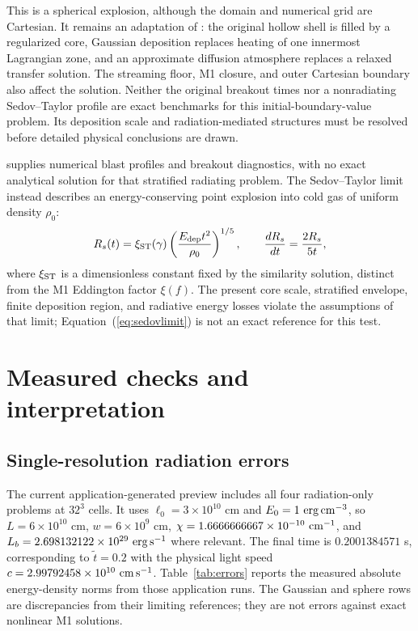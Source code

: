 \documentclass[manuscript]{aastex7}
\begin{document}
This is a spherical explosion, although the domain and numerical grid are
Cartesian. It remains an adaptation of \citet{Ensman1994}: the original
hollow shell is filled by a regularized core, Gaussian deposition replaces
heating of one innermost Lagrangian zone, and an approximate diffusion
atmosphere replaces a relaxed transfer solution. The streaming floor,
M1 closure, and outer Cartesian boundary also affect the solution. Neither
the original breakout times nor a nonradiating Sedov--Taylor profile are
exact benchmarks for this initial-boundary-value problem. Its deposition
scale and radiation-mediated structures must be resolved before detailed
physical conclusions are drawn.

\citet[Section~5.3]{Ensman1994} supplies numerical blast profiles and
breakout diagnostics, with no exact analytical solution for that
stratified radiating problem. The Sedov--Taylor limit instead describes
an energy-conserving point explosion into cold gas of uniform density
$\rho_0$:
\begin{equation}
 R_s(t)=\xi_{\rm ST}(\gamma)\left(\frac{E_{\rm dep}t^2}{\rho_0}\right)^{1/5},
 \qquad \frac{dR_s}{dt}=\frac{2R_s}{5t},
 \label{eq:sedovlimit}
\end{equation}
where $\xi_{\rm ST}$ is a dimensionless constant fixed by the similarity
solution, distinct from the M1 Eddington factor $\xi(f)$.
The present core scale, stratified envelope, finite deposition region,
and radiative energy losses violate the assumptions of that limit;
Equation~(\ref{eq:sedovlimit}) is not an exact reference for this test.

\section{Measured checks and interpretation}
\subsection{Single-resolution radiation errors}
The current application-generated preview includes all four
radiation-only problems at $32^3$ cells. It uses
$\ell_0=3\times10^{10}$ cm and $E_0=1\ {\rm erg\,cm^{-3}}$,
so $L=6\times10^{10}$ cm, $w=6\times10^9$ cm,
$\chi=1.6666666667\times10^{-10}\ {\rm cm^{-1}}$, and
$L_b=2.698132122\times10^{29}\ {\rm erg\,s^{-1}}$ where relevant.
The final time is $0.2001384571$ s, corresponding to
$\tilde t=0.2$ with the physical light speed
$c=2.99792458\times10^{10}\ {\rm cm\,s^{-1}}$.
Table~\ref{tab:errors} reports the measured absolute energy-density norms
from those application runs. The Gaussian and sphere rows are discrepancies
from their limiting references; they are not errors against exact nonlinear
M1 solutions.
\end{document}
